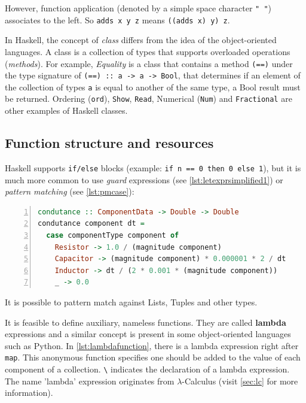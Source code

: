 However, function application (denoted by a simple space character \lstinline!" "!) associates to the left. So \lstinline!adds x y z! means \lstinline!((adds x) y) z!.

In Haskell, the concept of \textit{class} differs from the idea of the object-oriented languages. A class is a collection of types that supports overloaded operations (\textit{methods}). For example, \textit{Equality} is a class that contains a method \lstinline!(==)! under the type signature of \lstinline!(==) :: a -> a -> Bool!, that determines if an element of the collection of types \lstinline!a! is equal to another of the same type, a Bool result must be returned. Ordering (\lstinline!ord!), \lstinline!Show!, \lstinline!Read!, Numerical (\lstinline!Num!) and \lstinline!Fractional! are other examples of Haskell classes.


\subsection{Function structure and resources}\label{haskell:fnstr}

Haskell supports \lstinline!if/else! blocks (example: \lstinline!if n == 0 then 0 else 1!), but it is much more common to use \textit{guard} expressions (see \cref{lst:letexprsimplified1}) or \textit{pattern matching} (see \cref{lst:pmcase}):

\begin{lstlisting}[language=Haskell, numbers=left, caption={Pattern matching with case}, captionpos=b, label={lst:pmcase}]
condutance :: ComponentData -> Double -> Double
condutance component dt =
  case componentType component of
    Resistor -> 1.0 / (magnitude component)
    Capacitor -> (magnitude component) * 0.000001 * 2 / dt
    Inductor -> dt / (2 * 0.001 * (magnitude component))
    _ -> 0.0
\end{lstlisting}

It is possible to pattern match against Lists, Tuples and other types.

It is feasible to define auxiliary, nameless functions. They are called \textbf{lambda} expressions and a similar concept is present in some object-oriented languages such as Python. In \cref{lst:lambdafunction}, there is a lambda expression right after \lstinline!map!. This anonymous function specifies one should be added to the value of each component of a collection. \lstinline!\! indicates the declaration of a lambda expression. The name 'lambda' expression originates from $\lambda$-Calculus (visit \cref{sec:lc} for more information).


